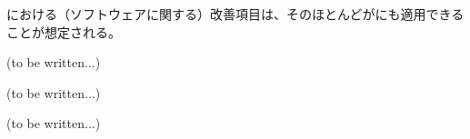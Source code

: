 

\MMC における（ソフトウェアに関する）改善項目は、そのほとんどが\DMC にも適用できることが想定される。


(to be written...)



(to be written...)



(to be written...)
